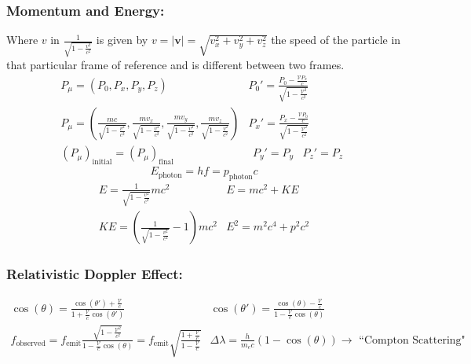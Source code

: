 \documentclass{article}
\begin{document}
	\subsubsection*{Momentum and Energy:} Where $v$ in $\frac{1}{\sqrt{1-\frac{v^2}{c^2}}}$ is given by $v=|\mathbf{v}|=\sqrt{v_x^2+v_y^2+v_z^2}$ the speed of the particle in that particular frame of reference and is different between two frames.
	\[
		\begin{array}{c|c}
		P_{\mu} = \left(P_0,P_x,P_y,P_z\right)	& P_0' = \frac{P_0-\frac{\mathcal{V} P_x}{c}}{\sqrt{1-\frac{\mathcal{V}^2}{c^2}}} \\ 
		P_{\mu} = \left(\frac{mc}{\sqrt{1-\frac{v^2}{c^2}}}, \frac{mv_x}{\sqrt{1-\frac{v^2}{c^2}}}, \frac{mv_y}{\sqrt{1-\frac{v^2}{c^2}}}, \frac{mv_z}{\sqrt{1-\frac{v^2}{c^2}}}\right)	&	P_x' = \frac{P_x-\frac{\mathcal{V} P_0}{c}}{\sqrt{1-\frac{\mathcal{V}^2}{c^2}}} \\ 
		\left(P_{\mu}\right)_{\text{initial}} = \left(P_{\mu}\right)_{\text{final}}	& \begin{array}{cc} P_y' = P_y & P_z' = P_z \end{array}
		\end{array}
	\]
	\[
	E_{\text{photon}} = hf = p_{\text{photon}}c
	\]
	\[	
		\begin{array}{c|c}
		E=\frac{1}{\sqrt{1-\frac{v^2}{c^2}}} mc^2	& E=mc^2+KE \\ 
		KE=\left(\frac{1}{\sqrt{1-\frac{v^2}{c^2}}}-1\right) mc^2	& E^2=m^2c^4+p^2c^2
		\end{array} 
	\]
	
	\subsubsection*{Relativistic Doppler Effect:}
	\[
	\begin{array}{c|c}
		\cos\left( \theta \right) = \frac{\cos\left( \theta' \right) + \frac{\mathcal{V}}{c}}{1+\frac{\mathcal{V}}{c}\cos\left( \theta' \right)}	&	\cos\left( \theta' \right) = \frac{\cos\left( \theta \right) - \frac{\mathcal{V}}{c}}{1 - \frac{\mathcal{V}}{c}\cos\left( \theta \right)}\\
		f_{\text{observed}} = f_{\text{emit}} \frac{\sqrt{1-\frac{\mathcal{V}^2}{c^2}}}{1-\frac{\mathcal{V}}{c}\cos\left( \theta \right)} = f_{\text{emit}} \sqrt{\frac{1 + \frac{\mathcal{V}}{c}}{1 - \frac{\mathcal{V}}{c}}}	&	\Delta\lambda = \frac{h}{m_e c} \left( 1 - \cos\left( \theta \right) \right) \longrightarrow\text{ ``Compton Scattering"}
	\end{array}
	\]
	
\end{document}
